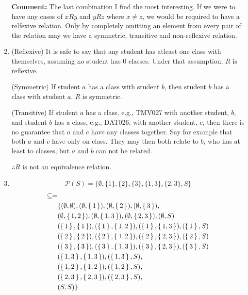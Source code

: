 \documentclass{article}
\begin{document}
\begin{enumerate}
        \textbf{Comment:} The last combination I find the most interesting. If we were to have any cases of $xRy$ and $yRz$ where $x\neq z$, we would be required to have a relfexive relation. Only by completely omitting an element from every pair of the relation may we have a symmetric, transitive and non-reflexive relation.

    \item
        (Reflexive) It is safe to say that any student has atleast one class with themselves, assuming no student has 0 classes. Under that assumption, $R$ is reflexive.

        (Symmetric) If student $a$ has a class with student $b$, then student $b$ has a class with student $a$. $R$ is symmetric.

        (Transitive) If student $a$ has a class, e.g., TMV027 with another student, $b$, and student $b$ has a class, e.g., DAT026, with another student, $c$, then there is no guarantee that $a$ and $c$ have any classes together. Say for example that both $a$ and $c$ have only on class. They may then both relate to $b$, who has at least to classes, but $a$ and $b$ can not be related.

        $\therefore R$ is not an equivalence relation.

    \item
        $$\mathcal{P}(S) = \{\emptyset, \{1\}, \{2\}, \{3\}, \{1,3\}, \{2,3\}, S\}$$
        \begin{align*}
            \subseteq =& \\
                       &\{(\emptyset, \emptyset), (\emptyset, \set{1}), (\emptyset, \set{2}), (\emptyset,\set{3}), \\
                       &(\emptyset, \set{1,2}), (\emptyset, \set{1,3}), (\emptyset, \set{2,3}), (\emptyset, S) \\
                       &(\set{1}, \set{1}), (\set{1}, \set{1,2}), (\set{1},\set{1,3}), (\set{1}, S) \\
                       &(\set{2}, \set{2}), (\set{2}, \set{1,2}), (\set{2},\set{2,3}), (\set{2}, S) \\
                       &(\set{3}, \set{3}), (\set{3}, \set{1,3}), (\set{3},\set{2,3}), (\set{3}, S) \\
                       &(\set{1,3}, \set{1,3}), (\set{1,3}, S), \\
                       &(\set{1,2}, \set{1,2}), (\set{1,2}, S), \\
                       &(\set{2,3}, \set{2,3}), (\set{2,3}, S), \\
                       &(S,S)\}
        \end{align*}


\end{enumerate}
\end{document}
